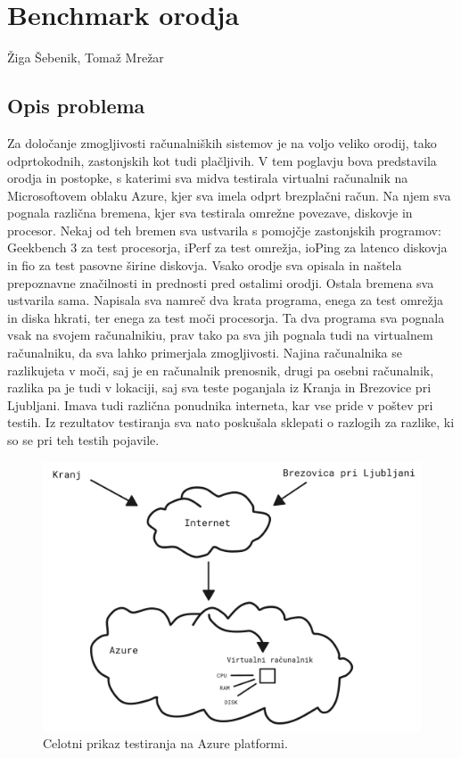 \chapter[Benchmark orodja]{Benchmark orodja}

\pagestyle{fancy}
\fancyhf{}
\fancyhead[LE,RO]{\thepage}
\fancyhead[RE,LO]{\leftmark}

\huge Žiga Šebenik, Tomaž Mrežar
\normalsize
\bigskip

\section{Opis problema}
Za določanje zmogljivosti računalniških sistemov je na voljo veliko orodij, tako odprtokodnih, zastonjskih kot tudi plačljivih. V tem poglavju bova predstavila orodja in postopke, s katerimi sva midva testirala virtualni računalnik na Microsoftovem oblaku Azure, kjer sva imela odprt brezplačni račun. Na njem sva pognala različna bremena, kjer sva testirala omrežne povezave, diskovje in procesor. Nekaj od teh bremen sva ustvarila s pomojčje zastonjskih programov: Geekbench 3 za test procesorja, iPerf za test omrežja, ioPing za latenco diskovja in fio za test pasovne širine diskovja. Vsako orodje sva opisala in naštela prepoznavne značilnosti in prednosti pred ostalimi orodji. Ostala bremena sva ustvarila sama. Napisala sva namreč dva krata programa, enega za test omrežja in diska hkrati, ter enega za test moči procesorja. Ta dva programa sva pognala vsak na svojem računalnikiu, prav tako pa sva jih pognala tudi na virtualnem računalniku, da sva lahko primerjala zmogljivosti. Najina računalnika se razlikujeta v moči, saj je en računalnik prenosnik, drugi pa osebni računalnik, razlika pa je tudi v lokaciji, saj sva teste poganjala iz Kranja in Brezovice pri Ljubljani. Imava tudi različna ponudnika interneta, kar vse pride v poštev pri testih. Iz rezultatov testiranja sva nato poskušala sklepati o razlogih za razlike, ki so se pri teh testih pojavile.
  
\begin{figure}[H]
	\centering
	\includegraphics[scale=0.15]{Img/celotni_diagram.png}
	\caption{Celotni prikaz testiranja na Azure platformi.}
	\label{fig:7_breme2}
\end{figure}

